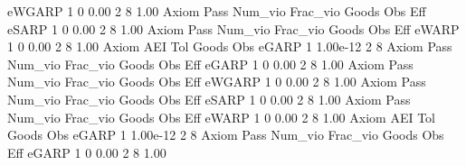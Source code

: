       eWGARP {\VBAR}    1           0        0.00           2           8        1.00  
{\smallskip}
{\smallskip}
{\smallskip}
       Axiom {\VBAR} Pass     Num_vio    Frac_vio       Goods         Obs         Eff  
       eSARP {\VBAR}    1           0        0.00           2           8        1.00  
{\smallskip}
{\smallskip}
{\smallskip}
       Axiom {\VBAR} Pass     Num_vio    Frac_vio       Goods         Obs         Eff  
       eWARP {\VBAR}    1           0        0.00           2           8        1.00  
{\smallskip}
       Axiom {\VBAR}       AEI        Tol      Goods        Obs 
       eGARP {\VBAR}         1   1.00e-12          2          8 
{\smallskip}
{\smallskip}
{\smallskip}
       Axiom {\VBAR} Pass     Num_vio    Frac_vio       Goods         Obs         Eff  
       eGARP {\VBAR}    1           0        0.00           2           8        1.00  
{\smallskip}
{\smallskip}
{\smallskip}
       Axiom {\VBAR} Pass     Num_vio    Frac_vio       Goods         Obs         Eff  
      eWGARP {\VBAR}    1           0        0.00           2           8        1.00  
{\smallskip}
{\smallskip}
{\smallskip}
       Axiom {\VBAR} Pass     Num_vio    Frac_vio       Goods         Obs         Eff  
       eSARP {\VBAR}    1           0        0.00           2           8        1.00  
{\smallskip}
{\smallskip}
{\smallskip}
       Axiom {\VBAR} Pass     Num_vio    Frac_vio       Goods         Obs         Eff  
       eWARP {\VBAR}    1           0        0.00           2           8        1.00  
{\smallskip}
       Axiom {\VBAR}       AEI        Tol      Goods        Obs 
       eGARP {\VBAR}         1   1.00e-12          2          8 
{\smallskip}
{\smallskip}
{\smallskip}
       Axiom {\VBAR} Pass     Num_vio    Frac_vio       Goods         Obs         Eff  
       eGARP {\VBAR}    1           0        0.00           2           8        1.00  
{\smallskip}
{\smallskip}
